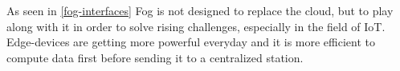 

As seen in \autoref{fog-interfaces} Fog is not designed to replace the cloud, but to play along with it in order to solve rising challenges, especially in the field of IoT. Edge-devices are getting more powerful everyday and it is more efficient to compute data first before sending it to a centralized station.\cite{computeB4Send}
